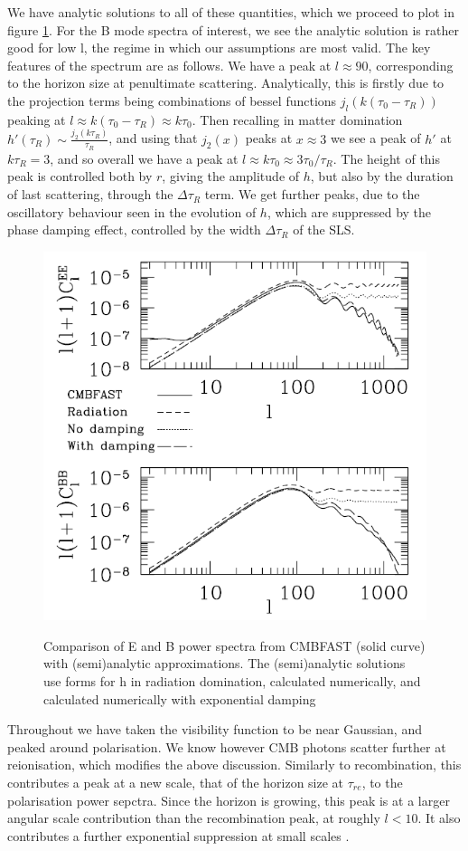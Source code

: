 \documentclass[a4paper,10pt]{article}
\begin{document}
We have analytic solutions to all of these quantities, which we proceed to plot in figure \ref{analytic1}. For the B mode spectra of interest, we see the analytic solution is rather good for low l, the regime in which our assumptions are most valid. The key features of the spectrum are as follows. We have a peak at $l\approx 90$, corresponding to the horizon size at penultimate scattering. Analytically, this is firstly due to the projection terms being combinations of bessel functions $j_l(k(\tau_0-\tau_R))$ peaking at $l\approx k(\tau_0-\tau_R)\approx k\tau_0$. Then recalling in matter domination $h'(\tau_R) \sim \frac{j_2(k\tau_R)}{\tau_R}$, and using that $j_2(x)$ peaks at $x\approx3$ we see a peak of $h'$ at $k\tau_R=3$, and so overall we have a peak at $l\approx k\tau_0\approx 3\tau_0/\tau_R$. The height of this peak is controlled both by $r$, giving the amplitude of $h$, but also by the duration of last scattering, through the $\Delta\tau_R$ term. We get further peaks, due to the oscillatory behaviour seen in the evolution of $h$, which are suppressed by the phase damping effect, controlled by the width $\Delta\tau_R$ of the SLS. \\



\begin{figure}[h]
  \includegraphics[width=0.5\linewidth]{analytic.png}
  \centering
  \label{analytic1}
  \caption{Comparison of E and B power spectra from CMBFAST (solid curve) with (semi)analytic approximations. The (semi)analytic solutions use forms for h in radiation domination, calculated numerically, and calculated numerically  with exponential damping}
\end{figure}


Throughout we have taken the visibility function to be near Gaussian, and peaked around polarisation. We know however CMB photons scatter further at reionisation, which modifies the above discussion. Similarly to recombination, this contributes a peak at a new scale, that of the horizon size at $\tau_{re}$, to the polarisation power sepctra. Since the horizon is growing, this peak is at a larger angular scale contribution than the recombination peak, at roughly $l<10$. It also contributes a further exponential suppression at small scales \cite{reionisation2}.\\
\end{document}
